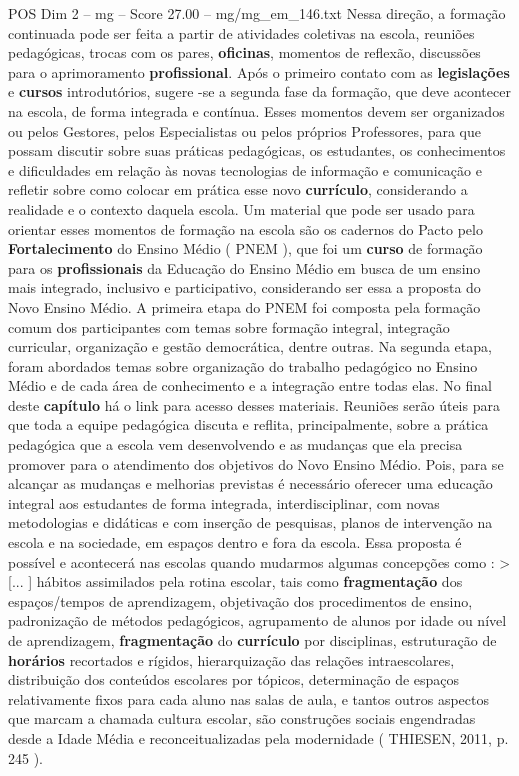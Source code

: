 \begin{textsample}{POS Dim 2 – mg – Score 27.00 – mg/mg\_em\_146.txt}
Nessa direção, a formação continuada pode ser feita a partir de atividades coletivas na escola, reuniões pedagógicas, trocas com os pares, \textbf{oficinas}, momentos de reflexão, discussões para o aprimoramento \textbf{profissional}.
Após o primeiro contato com as \textbf{legislações} e \textbf{cursos} introdutórios, sugere -se a segunda fase da formação, que deve acontecer na escola, de forma integrada e contínua.
Esses momentos devem ser organizados ou pelos Gestores, pelos Especialistas ou pelos próprios Professores, para que possam discutir sobre suas práticas pedagógicas, os estudantes, os conhecimentos e dificuldades em relação às novas tecnologias de informação e comunicação e refletir sobre como colocar em prática esse novo \textbf{currículo}, considerando a realidade e o contexto daquela escola.
Um material que pode ser usado para orientar esses momentos de formação na escola são os cadernos do Pacto pelo \textbf{Fortalecimento} do Ensino Médio ( PNEM ), que foi um \textbf{curso} de formação para os \textbf{profissionais} da Educação do Ensino Médio em busca de um ensino mais integrado, inclusivo e participativo, considerando ser essa a proposta do Novo Ensino Médio.
A primeira etapa do PNEM foi composta pela formação comum dos participantes com temas sobre formação integral, integração curricular, organização e gestão democrática, dentre outras.
Na segunda etapa, foram abordados temas sobre organização do trabalho pedagógico no Ensino Médio e de cada área de conhecimento e a integração entre todas elas.
No final deste \textbf{capítulo} há o link para acesso desses materiais.
Reuniões serão úteis para que toda a equipe pedagógica discuta e reflita, principalmente, sobre a prática pedagógica que a escola vem desenvolvendo e as mudanças que ela precisa promover para o atendimento dos objetivos do Novo Ensino Médio.
Pois, para se alcançar as mudanças e melhorias previstas é necessário oferecer uma educação integral aos estudantes de forma integrada, interdisciplinar, com novas metodologias e didáticas e com inserção de pesquisas, planos de intervenção na escola e na sociedade, em espaços dentro e fora da escola.
Essa proposta é possível e acontecerá nas escolas quando mudarmos algumas concepções como : > [... ] hábitos assimilados pela rotina escolar, tais como \textbf{fragmentação} dos espaços/tempos de aprendizagem, objetivação dos procedimentos de ensino, padronização de métodos pedagógicos, agrupamento de alunos por idade ou nível de aprendizagem, \textbf{fragmentação} do \textbf{currículo} por disciplinas, estruturação de \textbf{horários} recortados e rígidos, hierarquização das relações intraescolares, distribuição dos conteúdos escolares por tópicos, determinação de espaços relativamente fixos para cada aluno nas salas de aula, e tantos outros aspectos que marcam a chamada cultura escolar, são construções sociais engendradas desde a Idade Média e reconceitualizadas pela modernidade ( THIESEN, 2011, p. 245 ).

\end{textsample}
